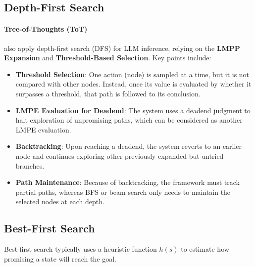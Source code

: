 \subsection{Depth-First Search}
\label{sec:depth}
\paragraph{Tree-of-Thoughts (ToT) \citep{yao2023tree}}
\citet{yao2023tree} also apply depth-first search (DFS) for LLM inference, relying on the \textbf{LMPP Expansion} and \textbf{Threshold-Based Selection}. Key points include:

\begin{itemize}
    \item \textbf{Threshold Selection}:
     One action (node) is sampled at a time, but it is not compared with other nodes. Instead, once its value is evaluated by whether it surpasses a threshold, that path is followed to its conclusion.
     
    \item \textbf{LMPE Evaluation for Deadend}:
    The system uses a deadend judgment to halt exploration of unpromising paths, which can be considered as another LMPE evaluation.
    \item \textbf{Backtracking}:
    Upon reaching a deadend, the system reverts to an earlier node and continues exploring other previously expanded but untried branches.
    
    \item \textbf{Path Maintenance}:
    Because of backtracking, the framework must track partial paths, whereas BFS or beam search only needs to maintain the selected nodes at each depth.
\end{itemize}

\subsection{Best-First Search}
\label{sec:best}
Best-first search typically uses a heuristic function \(h(s)\) to estimate how promising a state will reach the goal.

